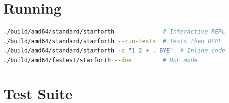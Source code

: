 \section{Running}
\label{vol1:sec:build:run}

\begin{lstlisting}[language=bash, caption={Running StarForth}]
./build/amd64/standard/starforth              # Interactive REPL
./build/amd64/standard/starforth --run-tests  # Tests then REPL
./build/amd64/standard/starforth -c "1 2 + . BYE"  # Inline code
./build/amd64/fastest/starforth --doe         # DoE mode
\end{lstlisting}

\section{Test Suite}
\label{vol1:sec:build:tests}

